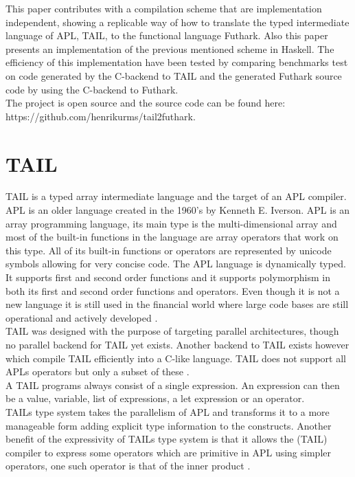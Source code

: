 \documentclass[11pt]{article}
\begin{document}
This paper contributes with a compilation scheme that are implementation independent, showing a replicable 
way of how to translate the typed intermediate language of APL, TAIL, to the functional language Futhark. Also 
this paper presents an implementation of the previous mentioned scheme in Haskell. The efficiency of this
 implementation have been tested by comparing benchmarks test on code generated by the C-backend to TAIL 
 and the generated Futhark source code by using the C-backend to Futhark. \\

The project is open source and the source code can be found here:\\ https://github.com/henrikurms/tail2futhark.

\section{TAIL}

TAIL is a typed array intermediate language and the target of an APL compiler.
APL is an older language created in the 1960's by Kenneth E. Iverson.
APL is an array programming language, its main type is the multi-dimensional array 
and most of the built-in functions in the language are array operators that work on this type. 
All of its built-in functions or operators are represented by unicode symbols allowing for very concise code.
The APL language is dynamically typed. It supports first and second order functions and it supports polymorphism in 
both its first and second order functions and operators. 
Even though it is not a new language it is still used in the financial world 
where large code bases are still operational and actively developed \cite{ElsmanDybdal:Array:2014}. \\


TAIL was designed with the purpose of targeting parallel architectures, though no parallel backend for TAIL yet exists.
Another backend to TAIL exists however which compile TAIL efficiently into a C-like language. TAIL does not support
 all APLs operators but only a subset of these \cite{ElsmanDybdal:Array:2014}.\\

A TAIL programs always consist of a single expression. An expression can then be a value, variable, 
list of expressions, a let expression or an operator. \\

TAILs type system takes the parallelism of APL and transforms it to a more manageable form adding explicit type
 information to the constructs.
Another benefit of the expressivity of TAILs type system is that it allows the (TAIL) compiler to express some operators which
are primitive in APL using simpler operators, one such operator is that of the inner product \cite{ElsmanDybdal:Array:2014}. \\
 
\end{document}
